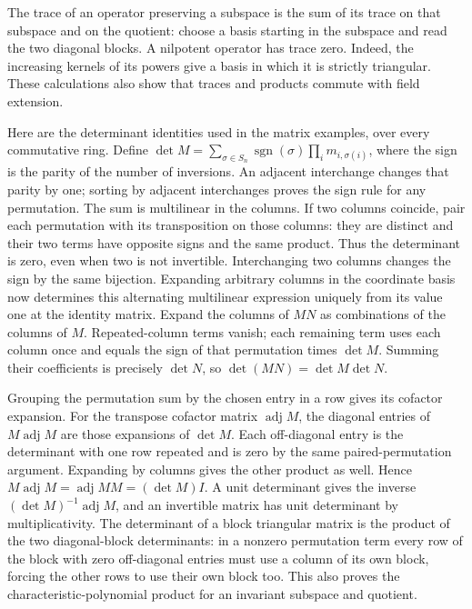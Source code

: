 \documentclass[11pt,a4paper,openany]{report}
\begin{document}
The trace of an operator preserving a subspace is the sum of its trace on that subspace and on the quotient: choose a basis starting in the subspace and read the two diagonal blocks. A nilpotent operator has trace zero. Indeed, the increasing kernels of its powers give a basis in which it is strictly triangular. These calculations also show that traces and products commute with field extension.

Here are the determinant identities used in the matrix examples, over every commutative ring. Define \(\det M=\sum_{\sigma\in S_n}\operatorname{sgn}(\sigma)\prod_i m_{i,\sigma(i)}\), where the sign is the parity of the number of inversions. An adjacent interchange changes that parity by one; sorting by adjacent interchanges proves the sign rule for any permutation. The sum is multilinear in the columns. If two columns coincide, pair each permutation with its transposition on those columns: they are distinct and their two terms have opposite signs and the same product. Thus the determinant is zero, even when two is not invertible. Interchanging two columns changes the sign by the same bijection. Expanding arbitrary columns in the coordinate basis now determines this alternating multilinear expression uniquely from its value one at the identity matrix. Expand the columns of \(MN\) as combinations of the columns of \(M\). Repeated-column terms vanish; each remaining term uses each column once and equals the sign of that permutation times \(\det M\). Summing their coefficients is precisely \(\det N\), so \(\det(MN)=\det M\det N\).

Grouping the permutation sum by the chosen entry in a row gives its cofactor expansion. For the transpose cofactor matrix \(\operatorname{adj}M\), the diagonal entries of \(M\operatorname{adj}M\) are those expansions of \(\det M\). Each off-diagonal entry is the determinant with one row repeated and is zero by the same paired-permutation argument. Expanding by columns gives the other product as well. Hence \(M\operatorname{adj}M=\operatorname{adj}M M=(\det M)I\). A unit determinant gives the inverse \((\det M)^{-1}\operatorname{adj}M\), and an invertible matrix has unit determinant by multiplicativity. The determinant of a block triangular matrix is the product of the two diagonal-block determinants: in a nonzero permutation term every row of the block with zero off-diagonal entries must use a column of its own block, forcing the other rows to use their own block too. This also proves the characteristic-polynomial product for an invariant subspace and quotient.
\end{document}
